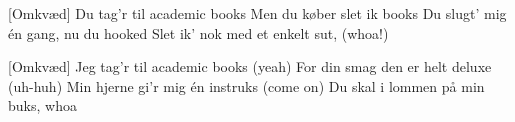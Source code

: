 \documentclass[a4paper, 11pt]{article}
\begin{document}
\begin{song}
[Omkvæd] Du tag’r til academic books
Men du køber slet ik books 
Du slugt’ mig én gang, nu du hooked
Slet ik’ nok med et enkelt sut, (whoa!)

[Omkvæd] Jeg tag’r til academic books (yeah)
For din smag den er helt deluxe (uh-huh)
Min hjerne gi’r mig én instruks (come on)
Du skal i lommen på min buks, whoa












\end{song}
\end{document}
